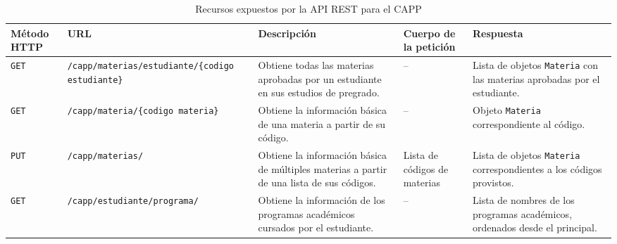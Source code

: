 \begin{table}[H]
	\centering
	\alternatecolors
	\caption{Recursos expuestos por la \gls{API REST} para el  \gls{CAPP} }
	\label{tab:capp_api_resources}
	\begin{tabular}{p{1.5cm}p{2.6cm}p{3.8cm}p{2cm}p{3cm}}
		\hline
		\textbf{Método HTTP} & \textbf{URL}                                                                                                & \textbf{Descripción}                                                                      & \textbf{Cuerpo de la petición} & \textbf{Respuesta}                                                              \\ \hline
		\texttt{GET}         & \texttt{/capp}\newline\texttt{/materias}\newline\texttt{/estudiante}\newline\texttt{/\{codigo estudiante\}} & Obtiene todas las materias aprobadas por un estudiante en sus estudios de pregrado.       & --                             & Lista de objetos \texttt{Materia} con las materias aprobadas por el estudiante. \\
		\texttt{GET}         & \texttt{/capp}\newline\texttt{/materia}\newline\texttt{/\{codigo materia\}}                                 & Obtiene la información básica de una materia a partir de su código.                       & --                             & Objeto \texttt{Materia} correspondiente al código.                              \\
		\texttt{PUT}         & \texttt{/capp}\newline\texttt{/materias/}                                                                   & Obtiene la información básica de múltiples materias a partir de una lista de sus códigos. & Lista de códigos de materias   & Lista de objetos \texttt{Materia} correspondientes a los códigos provistos.     \\
		\texttt{GET}         & \texttt{/capp}\newline\texttt{/estudiante}\newline\texttt{/programa/}                                       & Obtiene la información de los programas académicos cursados por el estudiante.            & --                             & Lista de nombres de los programas académicos, ordenados desde el principal.     \\
	\end{tabular}
\end{table}

